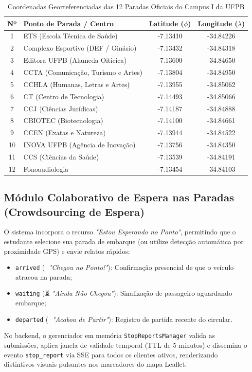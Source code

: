 \documentclass[lettersize,journal]{IEEEtran}
\begin{document}
\begin{table}[h]
\centering
\caption{Coordenadas Georreferenciadas das 12 Paradas Oficiais do Campus I da UFPB}
\label{tab_paradas}
\begin{tabular}{clcc}
\toprule
\textbf{Nº} & \textbf{Ponto de Parada / Centro} & \textbf{Latitude ($\phi$)} & \textbf{Longitude ($\lambda$)} \\
\midrule
1 & ETS (Escola Técnica de Saúde) & -7.13410 & -34.84226 \\
2 & Complexo Esportivo (DEF / Ginásio) & -7.13432 & -34.84318 \\
3 & Editora UFPB (Alameda Oiticica) & -7.13600 & -34.84650 \\
4 & CCTA (Comunicação, Turismo e Artes) & -7.13804 & -34.84950 \\
5 & CCHLA (Humanas, Letras e Artes) & -7.13955 & -34.85062 \\
6 & CT (Centro de Tecnologia) & -7.14493 & -34.85066 \\
7 & CCJ (Ciências Jurídicas) & -7.14187 & -34.84888 \\
8 & CBIOTEC (Biotecnologia) & -7.14100 & -34.84661 \\
9 & CCEN (Exatas e Natureza) & -7.13944 & -34.84522 \\
10 & INOVA UFPB (Agência de Inovação) & -7.13756 & -34.84350 \\
11 & CCS (Ciências da Saúde) & -7.13539 & -34.84191 \\
12 & Fonoaudiologia & -7.13454 & -34.84103 \\
\bottomrule
\end{tabular}
\end{table}

\subsection{Módulo Colaborativo de Espera nas Paradas (Crowdsourcing de Espera)}
O sistema incorpora o recurso \textit{"Estou Esperando no Ponto"}, permitindo que o estudante selecione sua parada de embarque (ou utilize detecção automática por proximidade GPS) e envie relatos rápidos:
\begin{itemize}
    \item \texttt{arrived} (🚌 \textit{"Chegou no Ponto!"}): Confirmação presencial de que o veículo atracou na parada;
    \item \texttt{waiting} (⏳ \textit{"Ainda Não Chegou"}): Sinalização de passageiro aguardando embarque;
    \item \texttt{departed} (💨 \textit{"Acabou de Partir"}): Registro de partida recente do circular.
\end{itemize}
No backend, o gerenciador em memória \texttt{StopReportsManager} valida as submissões, aplica janela de validade temporal (TTL de 5 minutos) e dissemina o evento \texttt{stop\_report} via SSE para todos os clientes ativos, renderizando distintivos visuais pulsantes nos marcadores do mapa Leaflet.
\end{document}
